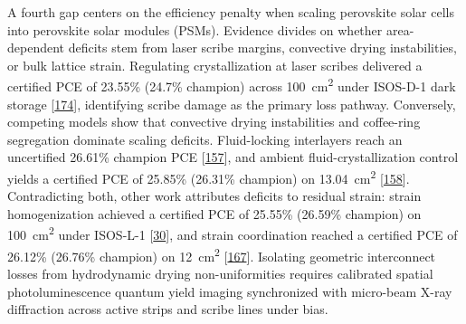\documentclass[
  11pt,
]{article}
\begin{document}
A fourth gap centers on the efficiency penalty when scaling perovskite
solar cells into perovskite solar modules (PSMs). Evidence divides on
whether area-dependent deficits stem from laser scribe margins,
convective drying instabilities, or bulk lattice strain. Regulating
crystallization at laser scribes delivered a certified PCE of 23.55\%
(24.7\% champion) across \qty{100}{\centi\meter\squared} under ISOS-D-1
dark storage
{[}\href{https://doi.org/10.1038/s41467-026-69685-6}{174}{]},
identifying scribe damage as the primary loss pathway. Conversely,
competing models show that convective drying instabilities and
coffee-ring segregation dominate scaling deficits. Fluid-locking
interlayers reach an uncertified 26.61\% champion PCE
{[}\href{https://doi.org/10.1002/adma.202518582}{157}{]}, and ambient
fluid-crystallization control yields a certified PCE of 25.85\% (26.31\%
champion) on \qty{13.04}{\centi\meter\squared}
{[}\href{https://doi.org/10.1002/adma.73373}{158}{]}. Contradicting
both, other work attributes deficits to residual strain: strain
homogenization achieved a certified PCE of 25.55\% (26.59\% champion) on
\qty{100}{\centi\meter\squared} under ISOS-L-1
{[}\href{https://doi.org/10.1126/sciadv.aec3238}{30}{]}, and strain
coordination reached a certified PCE of 26.12\% (26.76\% champion) on
\qty{12}{\centi\meter\squared}
{[}\href{https://doi.org/10.1002/adfm.76756}{167}{]}. Isolating
geometric interconnect losses from hydrodynamic drying non-uniformities
requires calibrated spatial photoluminescence quantum yield imaging
synchronized with micro-beam X-ray diffraction across active strips and
scribe lines under bias.
\end{document}
